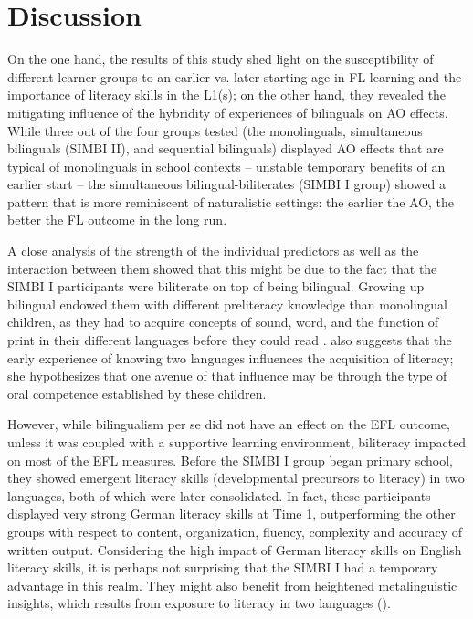 \documentclass[output=paper,modfonts,nonflat,newtxmath]{langsci/langscibook}
\begin{document}
\clearpage
\section{Discussion}\largerpage

On the one hand, the results of this study shed light on the susceptibility of different learner groups to an earlier vs. later starting age in FL learning and the importance of literacy skills in the L1(s); on the other hand, they revealed the mitigating influence of the hybridity of experiences of bilinguals on AO effects. While three out of the four groups tested (the monolinguals, simultaneous bilinguals (SIMBI II), and sequential bilinguals) displayed AO effects that are typical of monolinguals in school contexts – unstable temporary benefits of an earlier start – the simultaneous bilingual-biliterates (SIMBI I group) showed a pattern that is more reminiscent of naturalistic settings: the earlier the AO, the better the FL outcome in the long run.

A close analysis of the strength of the individual predictors as well as the interaction between them showed that this might be due to the fact that the SIMBI I participants were biliterate on top of being bilingual. Growing up bilingual endowed them with different preliteracy knowledge than monolingual children, as they had to acquire concepts of sound, word, and the function of print in their different languages before they could read \citep{Bialystok2007}. \citet{Bialystok2007} also suggests that the early experience of knowing two languages influences the acquisition of literacy; she hypothesizes that one avenue of that influence may be through the type of oral competence established by these children.

However, while bilingualism per se did not have an effect on the EFL outcome, unless it was coupled with a supportive learning environment, biliteracy impacted on most of the EFL measures. Before the SIMBI I group began primary school, they showed emergent literacy skills (developmental precursors to literacy) in two languages, both of which were later consolidated. In fact, these participants displayed very strong German literacy skills at Time 1, outperforming the other groups with respect to content, organization, fluency, complexity and accuracy of written output. Considering the high impact of German literacy skills on English literacy skills, it is perhaps not surprising that the SIMBI I had a temporary advantage in this realm. They might also benefit from heightened metalinguistic insights, which results from exposure to literacy in two languages (\citealt{Sanz2000, Bialystok2007}).
\end{document}
